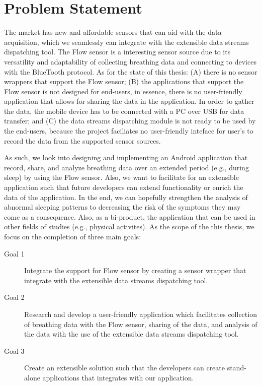 \section{Problem Statement}

The market has new and affordable sensors that can aid with the data acquisition, which we seamlessly can integrate with the extensible data streams dispatching tool. The Flow sensor is a interesting sensor source due to its versatility and adaptability of collecting breathing data and connecting to devices with the BlueTooth protocol. As for the state of this thesis: (A) there is no sensor wrappers that support the Flow sensor; (B) the applications that support the Flow sensor is not designed for end-users, in essence, there is no user-friendly application that allows for sharing the data in the application. In order to gather the data, the mobile device has to be connected with a PC over USB for data transfer; and (C) the data streams dispatching module is not ready to be used by the end-users, because the project faciliates no user-friendly inteface for user's to record the data from the supported sensor sources.

As such, we look into designing and implementing an Android application that record, share, and analyze breathing data over an extended period (e.g., during sleep) by using the Flow sensor. Also, we want to facilitate for an extensible application such that future developers can extend functionality or enrich the data of the application. In the end, we can hopefully strengthen the analysis of abnormal sleeping patterns to decreasing the risk of the symptoms they may come as a consequence. Also, as a bi-product, the application that can be used in other fields of studies (e.g., physical activites). As the scope of the this thesis, we focus on the completion of three main goals:

\begin{description}
    \item[Goal 1] Integrate the support for Flow sensor by creating a sensor wrapper that integrate with the extensible data streams dispatching tool.
    \item[Goal 2] Research and develop a user-friendly application which facilitates collection of breathing data with the Flow sensor, sharing of the data, and analysis of the data with the use of the extensible data streams dispatching tool.
    \item[Goal 3] Create an extensible solution such that the developers can create stand-alone applications that integrates with our application. 
\end{description}

